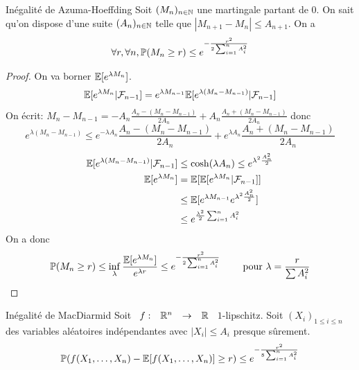 \documentclass[]{report}
\begin{document}
    \begin{tm}{Inégalité de Azuma-Hoeffding}{}
        Soit $(M_n)_{n\in\mathbb{N}}$ une martingale partant de $0$. On sait qu'on dispose d'une suite $(A_n)_{n\in\mathbb{N}}$ telle que $|M_{n+1}-M_n|\le A_{n+1}$. On a
        \[\forall r,\forall n,\mathbb{P}(M_n\ge r)\le e^{-\frac{r^2}{2\sum_{i=1}^{n}A_i^2}}\]
    \end{tm}

    \begin{proof}
        On va borner $\mathbb{E}[e^{\lambda M_n}]$.
        \[\mathbb{E}[e^{\lambda M_n}|\mathcal{F}_{n-1}]=e^{\lambda M_{n-1}}\mathbb{E}[e^{\lambda(M_n-M_{n-1})}|\mathcal{F}_{n-1}]\]
        On écrit: $M_n-M_{n-1}=-A_n\frac{A_n-(M_n-M_{n-1})}{2A_n}+A_n \frac{A_n+(M_n-M_{n-1})}{2A_n}$ donc
        \[e^{\lambda(M_n-M_{n-1})}\le e^{-\lambda A_n}\frac{A_n-(M_n-M_{n-1})}{2A_n}+e^{\lambda A_n}\frac{A_n+(M_n-M_{n-1})}{2A_n}\]
        \begin{align*}
            \mathbb{E}[e^{\lambda(M_n-M_{n-1})}|\mathcal{F}_{n-1}]&\le \cosh (\lambda A_n)\le e^{\lambda^2 \frac{A_n^2}{2}}\\
            \mathbb{E}[e^{\lambda M_n}]&=\mathbb{E}[\mathbb{E}[e^{\lambda M_n}|\mathcal{F}_{n-1}]]\\
            &\le \mathbb{E}[e^{\lambda M_{n-1}}e^{\lambda^2\frac{A_n^2}{2}}]\\
            &\le e^{\frac{\lambda^2}{2}\sum_{i=1}^{n}A_i^2}
        \end{align*}
        On a donc
        \[\mathbb{P}(M_n\ge r)\le \inf_\lambda \frac{\mathbb{E}[e^{\lambda M_n}]}{e^{\lambda r}}\le e^{-\frac{r^2}{2\sum_{i=1}^{n}A_i^2}}\qquad \text{ pour $\lambda=\frac{r}{\sum A_i^2}$}\]
    \end{proof}

    \begin{tm}{Inégalité de MacDiarmid}{}
        Soit $\begin{array}{ccccc} f : & \mathbb{R}^n & \to & \mathbb{R} \end{array}$ $1$-lipschitz. Soit $(X_i)_{1\le i\le n}$ des variables aléatoires indépendantes avec $|X_i|\le A_i$ presque sûrement.
        \[\mathbb{P}(f(X_1,\ldots,X_n)-\mathbb{E}[f(X_1,\ldots,X_n)]\ge r)\le e^{-\frac{r^2}{8\sum_{i=1}^{n}A_{i}^2}}\]
    \end{tm}
\end{document}
